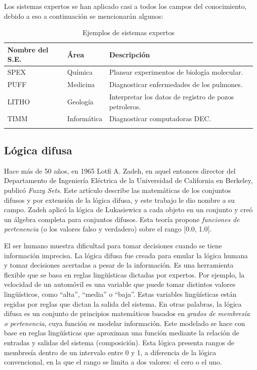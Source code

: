 Los sistemas expertos se han aplicado casi a todos los campos del conocimiento, debido a eso a continuación se mencionarán algunos:


\begin{longtable}[c]{lll} \toprule
	Nombre del S.E.& Área & Descripción\\\midrule
	SPEX & Química & Planear experimentos de biología molecular. \\
	PUFF & Medicina & Diagnosticar enfermedades de los pulmones. \\
	LITHO & Geología & Interpretar los datos de registro de pozos petroleros.\\
	TIMM & Informática & Diagnosticar computadoras DEC.\\\bottomrule
	\caption{Ejemplos de sistemas expertos}
\end{longtable}


\subsection{Lógica difusa}\label{seccion:logicadifusa}
Hace más de 50 años, en 1965 Lotfi A. Zadeh, en aquel entonces director del Departamento de Ingeniería Eléctrica de la
Universidad de California en Berkeley, publicó \emph{Fuzzy Sets}. Este artículo describe las matemáticas de los
conjuntos difusos y por extensión de la lógica difusa, y este trabajo le dio nombre a su campo. Zadeh
aplicó la lógica de Lukasiewicz a cada objeto en un conjunto y creó un álgebra completa para conjuntos
difusos. Esta teoría propone \emph{funciones de pertenencia} (o los valores falso y verdadero) sobre el rango
[0.0, 1.0]. 

El ser humano muestra dificultad para tomar decisiones cuando
se tiene información imprecisa. La lógica difusa fue creada para emular la lógica humana y tomar decisiones
acertadas a pesar de la información. Es una herramienta flexible que se basa en reglas lingüísticas
dictadas por expertos. Por ejemplo, la velocidad de un automóvil es una variable que puede tomar distintos
valores lingüísticos, como “alta”, “media” o “baja”. Estas variables lingüísticas están regidas por
reglas que dictan la salida del sistema.
En otras palabras, la lógica difusa es un conjunto de principios matemáticos basados en \emph{grados de
membresía o pertenencia}, cuya función es modelar información. Este modelado se hace con base en
reglas lingüísticas que aproximan una función mediante la relación de entradas y salidas del sistema
(composición). Esta lógica presenta rangos de membresía dentro de un intervalo entre 0 y 1, a diferencia
de la lógica convencional, en la que el rango se limita a dos valores: el cero o el uno.




